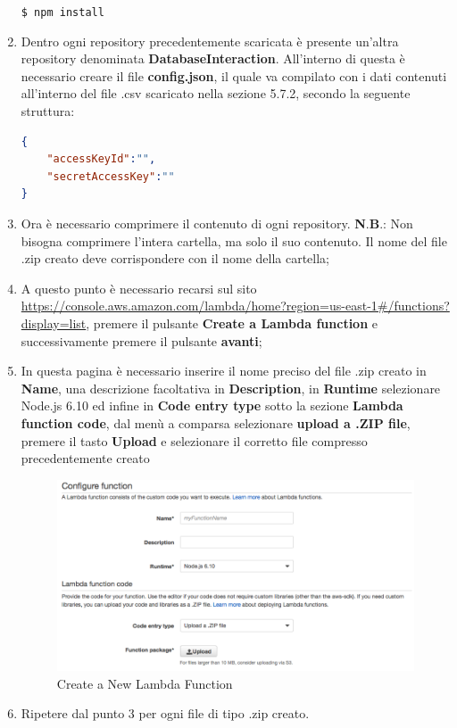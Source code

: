 \documentclass[../ManualeSviluppatore_v2.0.0.tex]{subfiles}
\begin{document}
\begin{enumerate}
\begin{center}
				\texttt{\$ npm install}
			\end{center}
			\item Dentro ogni repository precedentemente scaricata è presente un'altra repository denominata \textbf{DatabaseInteraction}. All'interno di questa è necessario creare il file \textbf{config.json}, il quale va compilato con i dati contenuti all'interno del file .csv scaricato nella sezione 5.7.2, secondo la seguente struttura:
			\begin{lstlisting}[language=json,firstnumber=1]
{
	"accessKeyId":"",
	"secretAccessKey":""
}
			\end{lstlisting}
			\item Ora è necessario comprimere il contenuto di ogni repository.
			\newline
			\textbf{N}.\textbf{B}.: Non bisogna comprimere l'intera cartella, ma solo il suo contenuto. Il nome del file .zip creato deve corrispondere con il nome della cartella;
			\item A questo punto è necessario recarsi sul sito \url{https://console.aws.amazon.com/lambda/home?region=us-east-1#/functions?display=list}, premere il pulsante \textbf{Create a Lambda function} e successivamente premere il pulsante \textbf{avanti};
			\newpage
			\item In questa pagina è necessario inserire il nome preciso del file .zip creato in \textbf{Name}, una descrizione facoltativa in \textbf{Description}, in \textbf{Runtime} selezionare Node.js 6.10 ed infine in \textbf{Code entry type} sotto la sezione \textbf{Lambda function code}, dal menù a comparsa selezionare \textbf{upload a .ZIP file}, premere il tasto \textbf{Upload} e selezionare il corretto file compresso precedentemente creato
			\begin{figure}[!h]
				\centering
				\includegraphics[width=\textwidth]{Screenshot/LambdaCreate.png}
				\caption{Create a New Lambda Function}
			\end{figure}
			\item Ripetere dal punto 3 per ogni file di tipo .zip creato. 
		\end{enumerate}
	\newpage
\end{document}
